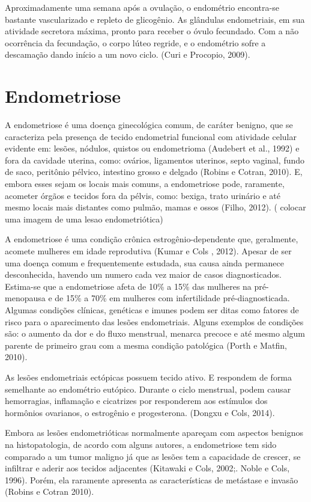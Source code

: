 \documentclass[12pt]{article} %
\begin{document}
Aproximadamente uma semana após a ovulação, o endométrio encontra-se
bastante vascularizado e repleto de glicogênio. As glândulas
endometriais, em sua atividade secretora máxima, %
pronto para receber o óvulo fecundado. Com a não ocorrência da
fecundação, o corpo lúteo regride, e o endométrio sofre a descamação
dando início a um novo ciclo.  (Curi e Procopio, 2009).

\section{Endometriose}

A endometriose é uma doença ginecológica comum, de caráter benigno,
que se caracteriza pela presença de tecido endometrial funcional com
atividade celular evidente em: lesões, nódulos, quistos ou
endometrioma (Audebert et al., 1992) e fora da cavidade uterina, como:
ovários, ligamentos uterinos, septo vaginal, fundo de saco, peritônio
pélvico, intestino grosso e delgado (Robins e Cotran, 2010). E, embora
esses sejam os locais mais comuns, a endometriose pode, raramente,
acometer órgãos e tecidos fora da pélvis, como: bexiga, trato urinário
e até mesmo locais mais distantes como pulmão, mamas e ossos (Filho,
2012).  ( colocar uma imagem de uma lesao endometriótica)

A endometriose é uma condição crônica estrogênio-dependente que,
geralmente, acomete mulheres em idade reprodutiva (Kumar e Cols ,
2012). Apesar de ser uma doença comum e frequentemente estudada, sua
causa ainda permanece desconhecida, havendo um numero cada vez maior
de casos diagnosticados. Estima-se que a endometriose afeta de 10\% a
15\% das mulheres na pré-menopausa e de 15\% a 70\% em mulheres com
infertilidade pré-diagnosticada. Algumas condições clínicas, genéticas
e imunes podem ser ditas como fatores de risco para o aparecimento das
lesões endometriais. Alguns exemplos de condições são: o aumento da
dor e do fluxo menstrual, menarca precoce e até mesmo algum parente de
primeiro grau com a mesma condição patológica (Porth e Matfin, 2010).

As lesões endometriais ectópicas possuem tecido ativo. E respondem de
forma semelhante ao endométrio eutópico. Durante o ciclo menstrual,
podem causar hemorragias, inflamação e cicatrizes por responderem aos
estímulos dos hormônios ovarianos, o estrogênio e
progesterona. (Dongxu e Cols, 2014).

Embora as lesões endometrióticas normalmente apareçam com aspectos
benignos na histopatologia, de acordo com alguns autores, a
endometriose tem sido comparado a um tumor maligno já que as lesões
tem a capacidade de crescer, se infiltrar e aderir aos tecidos
adjacentes (Kitawaki e Cols, 2002;. Noble e Cols, 1996). Porém, ela
raramente apresenta as características de metástase e invasão
(Robins e Cotran 2010).
\end{document}
